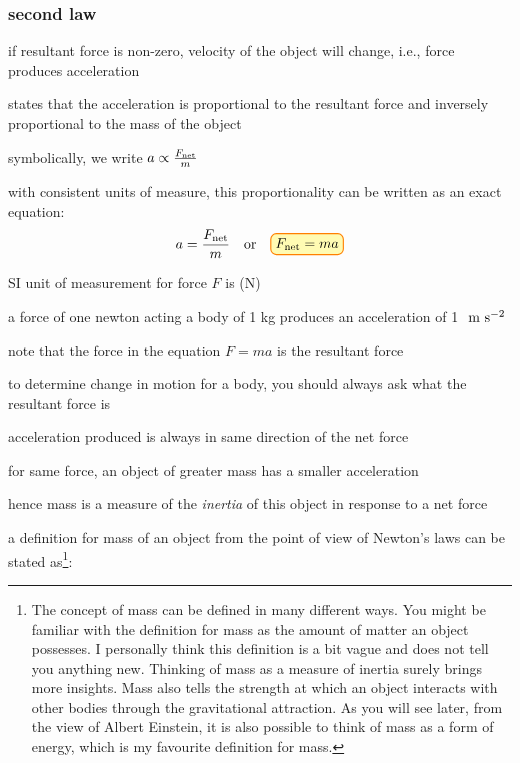 \subsubsection{second law}

if resultant force is non-zero, velocity of the object will change, i.e., force produces acceleration


\begin{ilight}
	 states that the acceleration is proportional to the resultant force and inversely proportional to the mass of the object
\end{ilight}

\cmt symbolically, we write $a \propto \frac{F_\text{net}}{m}$

with consistent units of measure, this proportionality can be written as an exact equation:
\begin{equation}
a=\frac{\fnet}{m} \quad \text{or} \quad \boxed{\fnet=ma}
\end{equation}

\cmt SI unit of measurement for force $F$ is  (N)

a force of one newton acting a body of 1 kg produces an acceleration of 1 $\text{ m s$^{-2}$}$

\cmt note that the force in the equation $F=ma$ is the resultant force

to determine change in motion for a body, you should always ask what the resultant force is

\cmt acceleration produced is always in same direction of the net force

\cmt for same force, an object of greater mass has a smaller acceleration

hence mass is a measure of the \emph{inertia} of this object in response to a net force

a definition for mass of an object from the point of view of Newton's laws can be stated as\footnote{The concept of mass can be defined in many different ways. You might be familiar with the definition for mass as the amount of matter an object possesses. I personally think this definition is a bit vague and does not tell you anything new. Thinking of mass as a measure of inertia surely brings more insights. Mass also tells the strength at which an object interacts with other bodies through the gravitational attraction. As you will see later, from the view of Albert Einstein, it is also possible to think of mass as a form of energy, which is my favourite definition for mass.}:

